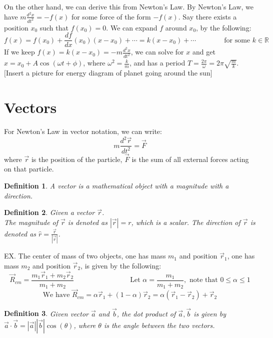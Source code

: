 \documentclass[11pt]{article}
\theoremstyle{break}
\theoremstyle{break}
\newtheorem{defn}{Definition}[corL]
\newcommand{\R}{\mathbb{R}}
\begin{document}
On the other hand, we can derive this from Newton's Law. By Newton's Law, we have $m\frac{d^2x}{dt^2} = -f(x)$ for some force of the form $-f(x)$. Say there exists a position $x_0$ such that $f(x_0) = 0$. We can expand $f$ around $x_0$, by the following:
$$f(x) = f(x_0) + \frac{df}{dx}(x_0) (x-x_0) + \cdots  = k(x-x_0) + \cdots \qquad\qquad \text{for some }k \in \R$$
If we keep $f(x) = k(x-x_0) = -m\frac{d^2x}{dt^2}$, we can solve for $x$ and get $x = x_0 + A \cos(\omega t+\phi)$, where $\omega^2 = \frac{k}{m}$, and has a period $T = \frac{2\pi}{\omega} = 2\pi \sqrt{\frac{m}{k}}$.\\

$[$Insert a picture for energy diagram of planet going around the sun$]$\\

\newpage
\section{\color{red} Vectors}
For Newton's Law in vector notation, we can write: $$m\frac{d^2\vec{r}}{dt^2} =\vec{F}$$
where $\vec{r}$ is the position of the particle, $\vec{F}$ is the sum of all external forces acting on that particle.
\begin{defn}
A vector is a mathematical object with a magnitude with a direction.
\end{defn}
\begin{defn}
Given a vector $\vec{r}$.\\
The magnitude of $\vec{r}$ is denoted as $|\vec{r}| = r$, which is a scalar. The direction of $\vec{r}$ is denoted as $\hat{r} = \frac{\vec{r}}{|\vec{r}|}$.
\end{defn}

EX. The center of mass of two objects, one has mass $m_1$ and position $\vec{r}_1$, one has mass $m_2$ and position $\vec{r}_2$, is given by the following:
$$\vec{R}_{cm} = \frac{m_1\vec{r}_1+m_2\vec{r}_2}{m_1+m_2}\qquad \qquad \qquad \qquad \text{Let }\alpha = \frac{m_1}{m_1+m_2},\text{ note that }0\leq \alpha \leq 1$$
$$\text{We have }\vec{R}_{cm} = \alpha \vec{r}_1 + (1-\alpha)\vec{r}_2 = \alpha(\vec{r}_1-\vec{r}_2)+\vec{r}_2$$

\begin{defn}
Given vector $\vec{a}$ and $\vec{b}$, the dot product of $\vec{a},\vec{b}$ is given by $\vec{a}\cdot \vec{b} = |\vec{a}||\vec{b}|\cos(\theta)$, where $\theta$ is the angle between the two vectors.
\end{defn}
\end{document}
